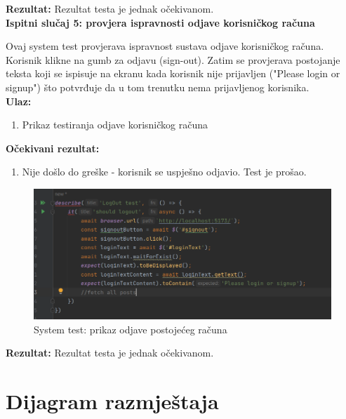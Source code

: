 			
			\textbf{Rezultat:}
			Rezultat testa je jednak očekivanom.\\
			
			\textbf{Ispitni slučaj 5: provjera ispravnosti odjave korisničkog računa}
			
			Ovaj system test provjerava ispravnost sustava odjave korisničkog računa. Korisnik klikne na gumb za odjavu (sign-out). Zatim se provjerava postojanje teksta koji se ispisuje na ekranu kada korisnik nije prijavljen ("Please login or signup") što potvrđuje da u tom trenutku nema prijavljenog korisnika. \\
			
			\textbf{Ulaz:}
			
				\begin{enumerate}
					\item Prikaz testiranja odjave korisničkog računa
				\end{enumerate}
				
			\textbf{Očekivani rezultat:}
			
				\begin{enumerate}
					\item Nije došlo do greške - korisnik se uspješno odjavio. Test je prošao.
				\end{enumerate}
			
			\begin{figure}[H]
				\includegraphics[scale=0.7]{slike/syslogout.PNG} 
				\centering
				\caption{System test: prikaz odjave postojećeg računa}
				\label{sysedit1}
			\end{figure}
			
			
			\textbf{Rezultat:}
			Rezultat testa je jednak očekivanom.\\
			
			\eject 
		
		
		\section{Dijagram razmještaja}
			
